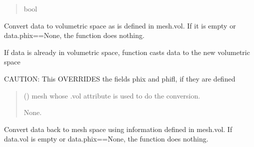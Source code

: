 \documentclass[letterpaper,10pt,english]{sphinxmanual}
\begin{document}
\begin{fulllineitems}
\begin{fulllineitems}
\begin{quote}
\begin{description}
\sphinxAtStartPar
bool

\end{description}\end{quote}

\end{fulllineitems}


\begin{fulllineitems}
\label{\detokenize{_autosummary/nirfasterff.base.data.flTRMomentsdata:nirfasterff.base.data.flTRMomentsdata.togrid}}
\pysigstartsignatures
{}
\pysigstopsignatures
\sphinxAtStartPar
Convert data to volumetric space as is defined in mesh.vol. If it is empty or data.phix==None, the function does nothing.

\sphinxAtStartPar
If data is already in volumetric space, function casts data to the new volumetric space

\sphinxAtStartPar
CAUTION: This OVERRIDES the fields phix and phifl, if they are defined
\begin{quote}\begin{description}
\sphinxAtStartPar
{} () \textendash{} mesh whose .vol attribute is used to do the conversion.

\sphinxAtStartPar
None.

\end{description}\end{quote}

\end{fulllineitems}


\begin{fulllineitems}
\label{\detokenize{_autosummary/nirfasterff.base.data.flTRMomentsdata:nirfasterff.base.data.flTRMomentsdata.tomesh}}
\pysigstartsignatures
{}
\pysigstopsignatures
\sphinxAtStartPar
Convert data back to mesh space using information defined in mesh.vol. If data.vol is empty or data.phix==None, the function does nothing.


\end{fulllineitems}
\end{fulllineitems}
\end{document}
